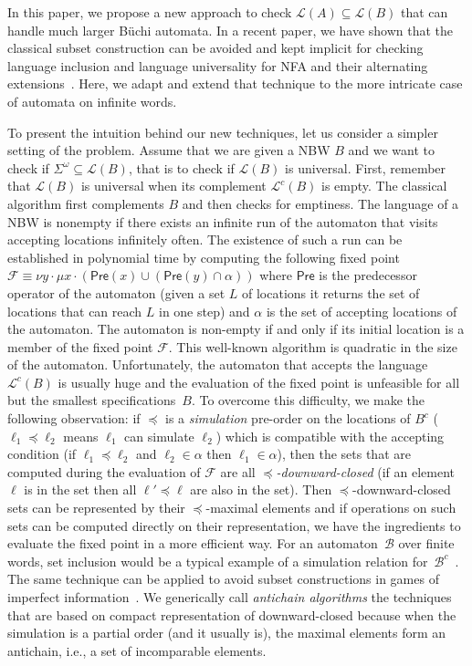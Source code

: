 \documentclass{LMCS}
\newcommand{\Pre}{\mathsf{Pre}}
\renewcommand{\l}{{\ell}}
\newcommand{\B}{\mathcal{B}}
\newcommand{\F}{\mathcal{F}}
\renewcommand{\L}{\mathcal{L}}
\begin{document}
In this paper, we propose a new approach to check $\L(A) \subseteq \L(B)$ 
that can handle much larger B\"uchi automata. In a recent paper, 
we have shown that the classical subset construction can
be avoided and kept implicit for checking language inclusion and
language universality for NFA and their alternating extensions~\cite{cav06}. 
Here, we adapt and extend that technique to the more intricate case of
automata on infinite words.

To present the intuition behind our new techniques, let us consider a
simpler setting of the problem. Assume that we
are given a NBW $B$ and we want to check if $\Sigma^{\omega}
\subseteq \L(B)$, that is to check if $\L(B)$ is universal.  First,
remember that $\L(B)$ is universal when its complement $\L^c(B)$ is empty.  The
classical algorithm first complements $B$ and then checks for
emptiness. The language of a NBW is nonempty if there exists an
infinite run of the automaton that visits accepting locations
infinitely often.  The existence of such a run can be established
in polynomial time by computing the following fixed point $\F \equiv \nu y \cdot \mu x \cdot ( \Pre(x)
\cup ( \Pre(y) \cap \alpha ))$ where $\Pre$ is the predecessor
operator of the automaton (given a set $L$ of locations it returns the
set of locations that can reach $L$ in one step) and $\alpha$ is the set
of accepting locations of the automaton. The automaton is non-empty if
and only if its initial location is a member of the fixed
point $\F$.  This well-known algorithm is quadratic in the size of the automaton.  
Unfortunately, the automaton that accepts the language $\L^c(B)$ is usually 
huge and the evaluation of the fixed point is unfeasible for all but the smallest 
specifications~$B$.  To overcome this difficulty, we make the following observation:
if $\preceq$ is a \emph{simulation} pre-order on the locations of $B^c$ 
($\l_1 \preceq \l_2$ means $\l_1$ can simulate $\l_2$) which is compatible with
the accepting condition (if $\l_1 \preceq \l_2$ and $\l_2 \in \alpha$
then $\l_1 \in \alpha$), then the sets that are computed during the
evaluation of $\F$ are all \emph{$\preceq$-downward-closed} (if an element
$\l$ is in the set then all $\l' \preceq \l$ are also in the set). Then
$\preceq$-downward-closed sets can be represented by their $\preceq$-maximal elements 
and if operations on such sets can be computed directly on their representation, 
we have the ingredients to evaluate the fixed point in a more efficient way.
For an automaton~$\B$ over finite words, set inclusion would be a typical example 
of a simulation relation for~$\B^c$~\cite{cav06}. The same technique can be applied
to avoid subset constructions in games of imperfect information~\cite{DDR06,CDHR07}.
We generically call \emph{antichain algorithms} the techniques that are based
on compact representation of downward-closed because when the simulation
is a partial order (and it usually is), the maximal elements form an antichain,
i.e., a set of incomparable elements.
\end{document}
